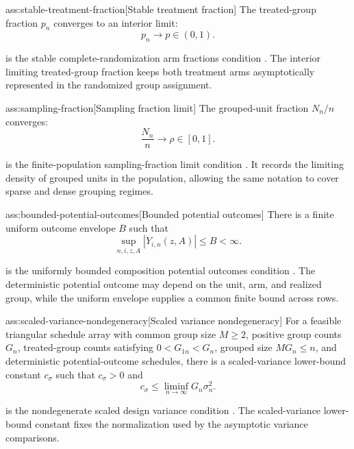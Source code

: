 \begin{assumptionv}{ass:stable-treatment-fraction}[Stable treatment fraction]
The treated-group fraction \(p_n\) converges to an interior limit:
\[
p_n \to p \in (0,1).
\]
\end{assumptionv}

 is the stable complete-randomization arm fractions condition \citep{LiDing2017}. The interior limiting treated-group fraction  keeps both treatment arms asymptotically represented in the randomized group assignment.

\begin{assumptionv}{ass:sampling-fraction}[Sampling fraction limit]
The grouped-unit fraction \(N_n/n\) converges:
\[
\frac{N_n}{n} \to \rho \in [0,1].
\]
\end{assumptionv}

 is the finite-population sampling-fraction limit condition \citep{Ohlsson1989}. It records the limiting density of grouped units in the population, allowing the same notation to cover sparse and dense grouping regimes.

\begin{assumptionv}{ass:bounded-potential-outcomes}[Bounded potential outcomes]
There is a finite uniform outcome envelope \(B\) such that
\[
\sup_{n,i,z,A}\left|Y_{i,n}(z,A)\right| \le B < \infty .
\]
\end{assumptionv}

 is the uniformly bounded composition potential outcomes condition \citep{FuSamiiWang2026}. The deterministic potential outcome  may depend on the unit, arm, and realized group, while the uniform envelope  supplies a common finite bound across rows.

\begin{assumptionv}{ass:scaled-variance-nondegeneracy}[Scaled variance nondegeneracy]
For a feasible triangular schedule array with common group size \(M\ge 2\), positive group counts \(G_n\), treated-group counts satisfying \(0<G_{1n}<G_n\), grouped size \(MG_n\le n\), and deterministic potential-outcome schedules, there is a scaled-variance lower-bound constant \(c_\sigma\) such that \(c_\sigma>0\) and
\[
c_\sigma \le \liminf_{n\to\infty} G_n\sigma_n^2 .
\]
\end{assumptionv}

 is the nondegenerate scaled design variance condition \citep{LiDing2017}. The scaled-variance lower-bound constant  fixes the normalization used by the asymptotic variance comparisons.

